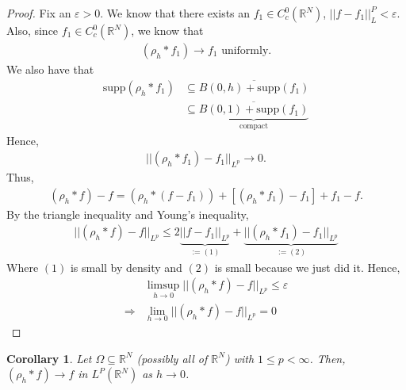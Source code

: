 \documentclass[psamsfonts]{amsart}
\newtheorem{cor}[thm]{Corollary}
\theoremstyle{definition}
\theoremstyle{remark}
\newcommand{\R}[0]{\mathbb{R}}
\newcommand{\eps}[0]{\varepsilon}
\numberwithin{equation}{section}
\begin{document}
\begin{proof}
	Fix an \( \eps > 0 \). We know that there exists an \( f_1 \in C_c^0(\R^N) \), \( ||f-f_1||_L^P < \eps \). Also, since \( f_1 \in C_c^0(\R^N) \), we know that 
	\begin{align*}
		(\rho_h * f_1) \rightarrow f_1 \text{ uniformly.} 
	\end{align*}
	We also have that
	\begin{align*}
		\mathrm{supp}(\rho_h * f_1) & \subseteq \overline{B(0,h) + \mathrm{supp}(f_1) } \\
		& \subseteq \underbrace{\overline{B(0,1) + \mathrm{supp}(f_1)}}_{\text{compact}}
	\end{align*}
	Hence, 
	\begin{align*}
		|| (\rho_h * f_1) - f_1||_{L^p} \rightarrow 0.
	\end{align*}
	Thus, 
	\begin{align*}
		(\rho_h * f) - f = (\rho_h * (f-f_1)) + [ (\rho_h *f_1) -f_1] + f_1 - f.
	\end{align*}
	By the triangle inequality and Young's inequality, 
	\begin{align*}
		|| (\rho_h *f)-f||_{L^p} \leq 2 \underbrace{|| f-f_1||_{L^p}}_{:=(1)} + \underbrace{||(\rho_h *f_1) - f_1 ||_{L^p}}_{:=(2)}
	\end{align*}
	Where \( (1) \) is small by density and \( (2) \) is small because we just did it. Hence, 
	\begin{align*}
		& \limsup_{h \rightarrow 0 } || (\rho_h * f) - f ||_{L^p} \leq \eps \\
		\Rightarrow & \lim_{h \rightarrow 0 } || (\rho_h *f) -f ||_{L^p} = 0 
	\end{align*}
\end{proof}

\begin{cor}
	Let \( \Omega \subseteq \R^N \) (possibly all of \( \R^N \)) with \( 1 \leq p < \infty \). Then, \( (\rho_h *f) \rightarrow f \) in \( L^P(\R^N) \) as \( h \rightarrow 0 \).
\end{cor}
\end{document}
